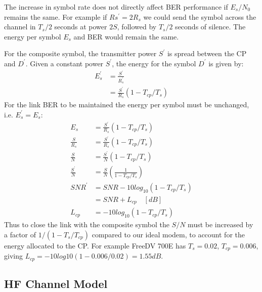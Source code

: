 \documentclass{article}
\begin{document}
The increase in symbol rate does not directly affect BER performance if $E_s/N_0$ remains the same. For example if $Rs^\prime=2R_s$ we could send the symbol across the channel in $T_s/2$ seconds at power $2S$, followed by $T_s/2$ seconds of silence.  The energy per symbol $E_s$ and BER would remain the same.

For the composite symbol, the transmitter power $S^\prime$ is spread between the CP and $D^\prime$.  Given a constant power $S^\prime$, the energy for the symbol $D^\prime$ is given by:
\begin{equation}
\begin{split}
E^\prime_s &= \frac{S^\prime}{R^\prime_s}  \\
           &= \frac{S^\prime}{R_s}(1 - T_{cp}/T_s)
\end{split}
\end{equation}
For the link BER to be maintained the energy per symbol must be unchanged, i.e. $E^\prime_s=E_s$:
\begin{equation}
\begin{split}
E_s           &= \frac{S^\prime}{R_s}(1 - T_{cp}/T_s) \\
\frac{S}{R_s} &= \frac{S^\prime}{R_s}(1 - T_{cp}/T_s) \\
\frac{S}{N} &= \frac{S^\prime}{N}(1 - T_{cp}/T_s) \\
\frac{S^\prime}{N} &= \frac{S}{N}\left(\frac{1}{1 - T_{cp}/T_s}\right) \\
SNR^\prime  &= SNR - 10log_{10}(1-T_{cp}/T_s) \\
            &= SNR + L_{cp} \quad [\si{dB}] \\
     L_{cp} &= -10log_{10}(1-T_{cp}/T_s)    
\end{split}
\end{equation}
Thus to close the link with the composite symbol the $S/N$ must be increased by a factor of $1/(1 - {T_s}/T_{cp})$ compared to our ideal modem, to account for the energy allocated to the CP.  For example FreeDV 700E has $T_s=0.02$, $T_{cp}=0.006$, giving $L_{cp}=-10log10(1-0.006/0.02)=1.55 \si{dB}$.

\subsection{HF Channel Model}
\end{document}
